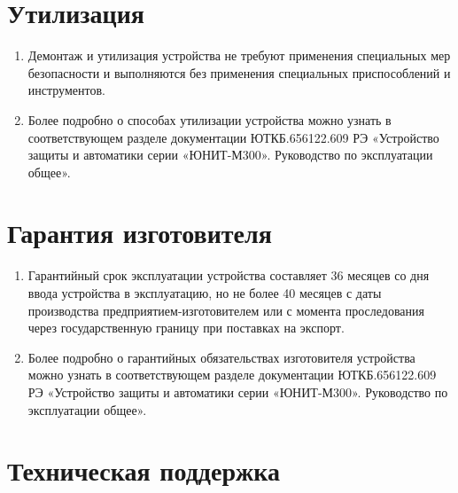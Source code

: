 \documentclass[a4paper, 12pt, table, hidelinks, DIV=calc]{extarticle}
\begin{document}
\vspace{3mm}
\color{unidarkgreen}\section[Утилизация]{Утилизация}\label{sec:util}
\color{black}

\begin{enumerate}[label=\arabic{section}.\arabic*, labelsep=4pt, leftmargin=0pt, itemindent=57pt]

\item
Демонтаж и утилизация устройства не требуют применения специальных мер безопасности и выполняются без применения специальных приспособлений и инструментов.
\item
Более подробно о способах утилизации устройства можно узнать в соответствующем разделе документации ЮТКБ.656122.609 РЭ «Устройство защиты и автоматики серии «ЮНИТ-М300». Руководство по эксплуатации общее».

\end{enumerate}

\vspace{3mm}
\color{unidarkgreen}\section[Гарантия изготовителя]{Гарантия изготовителя}\label{sec:garantee}
\color{black}

\begin{enumerate}[label=\arabic{section}.\arabic*, labelsep=4pt, leftmargin=0pt, itemindent=57pt]

\item
Гарантийный срок эксплуатации устройства составляет 36 месяцев со дня ввода устройства в эксплуатацию, но не более 40 месяцев с даты производства предприятием-изготовителем или с момента проследования через государственную границу при поставках на экспорт.
\item
Более подробно о гарантийных обязательствах изготовителя устройства можно узнать в соответствующем разделе документации ЮТКБ.656122.609 РЭ «Устройство защиты и автоматики серии «ЮНИТ-М300». Руководство по эксплуатации общее». 

\end{enumerate}\vspace{3mm}
\color{unidarkgreen}\section[Техническая поддержка]{Техническая поддержка}\label{sec:support}
\color{black}
\end{document}
